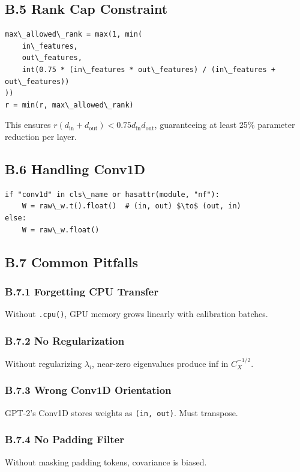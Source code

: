 \subsection{B.5 Rank Cap Constraint}

\begin{lstlisting}
max\_allowed\_rank = max(1, min(
    in\_features,
    out\_features,
    int(0.75 * (in\_features * out\_features) / (in\_features + out\_features))
))
r = min(r, max\_allowed\_rank)
\end{lstlisting}

This ensures $r(d_\text{in} + d_\text{out}) < 0.75 d_\text{in} d_\text{out}$, 
guaranteeing at least 25\% parameter reduction per layer.

\subsection{B.6 Handling Conv1D}

\begin{lstlisting}
if "conv1d" in cls\_name or hasattr(module, "nf"):
    W = raw\_w.t().float()  # (in, out) $\to$ (out, in)
else:
    W = raw\_w.float()
\end{lstlisting}

\subsection{B.7 Common Pitfalls}

\subsubsection{B.7.1 Forgetting CPU Transfer}

Without \texttt{.cpu()}, GPU memory grows linearly with calibration batches.

\subsubsection{B.7.2 No Regularization}

Without regularizing $\lambda_i$, near-zero eigenvalues produce inf in 
$C_X^{-1/2}$.

\subsubsection{B.7.3 Wrong Conv1D Orientation}

GPT-2's Conv1D stores weights as \texttt{(in, out)}. Must transpose.

\subsubsection{B.7.4 No Padding Filter}

Without masking padding tokens, covariance is biased.